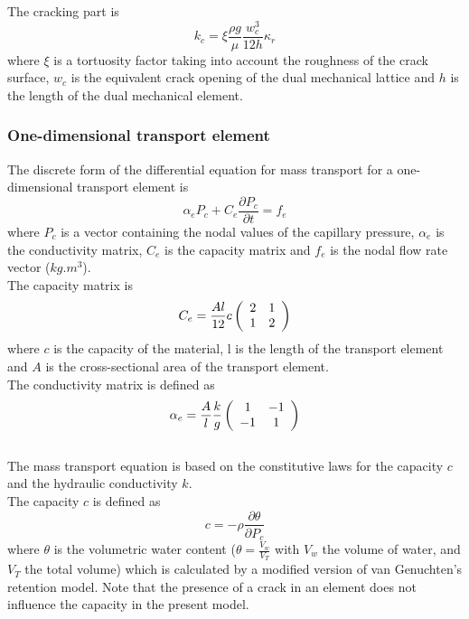 \documentclass[a4paper]{article}
\begin{document}
The cracking part is
\begin{equation}\label{latticetransmat13}
k_{c}=\xi\frac{\rho g}{\mu}\frac{w^{3}_{c}}{12h} \kappa_{r}
\end{equation}
where $\xi$ is a tortuosity factor taking into account the roughness of the crack surface, $w_{c}$ is the equivalent crack opening of the dual mechanical lattice and $h$ is the length of the dual mechanical element.

\subsubsection{One-dimensional transport element}
The discrete form of the differential equation for mass transport for a one-dimensional transport element is
\begin{equation}\label{latticetransmat3}
\alpha_{e}P_{c} + C_{e}\frac{\partial P_{c}}{\partial t}  = f_{e}
\end{equation}
where $P_{c}$ is a vector containing the nodal values of the capillary pressure, $\alpha_{e}$ is the conductivity matrix, $C_{e}$ is the capacity matrix and $f_{e}$ is the nodal flow rate vector ($kg.m^{3}$). \\

The capacity matrix is
\begin{equation}\label{latticetransmat4}
 C_{e} = \frac{Al}{12}c \left(  \begin{array}{ c c }  2 & 1 \\  1 & 2 \end{array}  \right)
\end{equation}
where $c$ is the capacity of the material, l is the length of the transport element and $A$ is the cross-sectional area of the transport element. \\

The conductivity matrix is defined as
\begin{equation}\label{latticetransmat5}
 \alpha_{e} = \frac{A}{l}\frac{k}{g} \left(  \begin{array}{ c c }  1 & -1 \\  -1 & 1 \end{array}  \right)
\end{equation}
\\

The mass transport equation is based on the constitutive laws for the capacity $c$ and the hydraulic conductivity $k$.\\

The capacity $c$ is defined as 
\begin{equation}\label{latticetransmat6}
c=-\rho\frac{\partial \theta}{\partial P_{c}}
\end{equation}
where $\theta$ is the volumetric water content ($\theta=\frac{V_{w}}{V_{T}}$ with $V_{w}$ the volume of water, and $V_{T}$ the total volume) which is calculated by a modified version of van Genuchten’s retention model. Note that the presence of a crack in an element does not influence the capacity in the present model.\\
\end{document}
